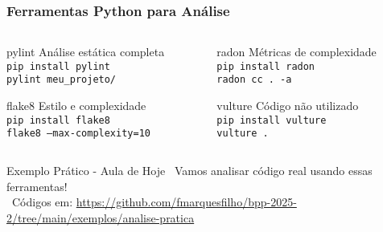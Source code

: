 \documentclass[aspectratio=169]{beamer}
\begin{document}
\begin{frame}
\frametitle{Ferramentas Python para Análise}
\begin{columns}
\begin{column}{0.5\textwidth}
\begin{block}{pylint}
\footnotesize
Análise estática completa\\
\texttt{pip install pylint}\\
\texttt{pylint meu\_projeto/}
\end{block}

\begin{block}{flake8}
\footnotesize
Estilo e complexidade\\
\texttt{pip install flake8}\\
\texttt{flake8 --max-complexity=10}
\end{block}
\end{column}

\begin{column}{0.5\textwidth}
\begin{block}{radon}
\footnotesize
Métricas de complexidade\\
\texttt{pip install radon}\\
\texttt{radon cc . -a}
\end{block}

\begin{block}{vulture}
\footnotesize
Código não utilizado\\
\texttt{pip install vulture}\\
\texttt{vulture .}
\end{block}
\end{column}
\end{columns}

\vspace{0.5cm}
\begin{alertblock}{Exemplo Prático - Aula de Hoje}
\footnotesize
\faCode \, Vamos analisar código real usando essas ferramentas! \\
\faGithub \, Códigos em: \url{https://github.com/fmarquesfilho/bpp-2025-2/tree/main/exemplos/analise-pratica}
\end{alertblock}
\end{frame}
\end{document}
